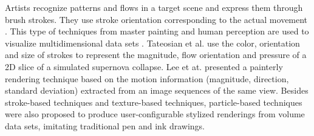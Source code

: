 Artists recognize patterns and flows in a target scene and express them through brush strokes. They use stroke orientation corresponding to the actual movement \cite{lee_motion_2009}. This type of techniques from master painting and human perception are used to visualize multidimensional data sets \cite{healey_perceptually_2004}. Tateosian et al. \cite{tateosian_engaging_2007} use the color, orientation and size of strokes to represent the magnitude, flow orientation and pressure of a 2D slice of a simulated supernova collapse.
Lee et at. \cite{lee_motion_2009} presented a painterly rendering technique based on the motion information (magnitude, direction, standard deviation) extracted from an image sequences of the same view.
Besides stroke-based techniques and texture-based techniques, particle-based techniques \cite{busking_particle-based_2007} \cite{van_pelt_illustrative_2010} were also proposed to produce user-configurable stylized renderings from volume data sets, imitating traditional pen and ink drawings.

%

